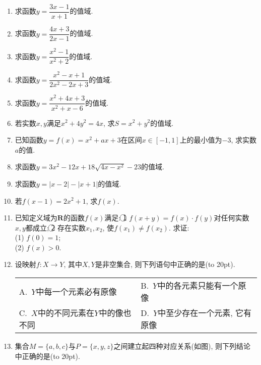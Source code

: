 \documentclass[10pt,a4paper]{article}
\newcommand{\bracket}[1]{(\hbox to #1pt{})}
\newcommand{\twoch}[4]{\par\begin{tabular}{p{.46\textwidth}p{.46\textwidth}}
A.~#1& B.~#2\\
C.~#3& D.~#4
\end{tabular}}
\begin{document}
\begin{enumerate}[1.]

\item 求函数$y=\dfrac{3x-1}{x+1}$的值域.
\item 求函数$y=\dfrac{4x+3}{2x-1}$的值域.
\item 求函数$y=\dfrac{x^2-1}{x^2+2}$的值域.
\item 求函数$y=\dfrac{x^2-x+1}{2x^2-2x+3}$的值域.
\item 求函数$y=\dfrac{x^2+4x+3}{x^2+x-6}$的值域.
\item 若实数$x,y$满足$x^2+4y^2=4x$, 求$S=x^2+y^2$的值域.
\item 已知函数$y=f(x)=x^2+ax+3$在区间$x\in [-1,1]$上的最小值为$-3$, 求实数$a$的值.
\item 求函数$y=3x^2-12x+18\sqrt {4x-x^2}-23$的值域.
\item 求函数$y=|x-2|-|x+1|$的值域.
\item 若$f(x-1)=2x^2+1$, 求$f(x)$.
\item 已知定义域为$\mathbf{R}$的函数$f(x)$满足:
\textcircled{1} $f(x+y)=f(x)\cdot f(y)$对任何实数$x,y$都成立;
\textcircled{2} 存在实数$x_1,x_2$, 使$f(x_1)\ne f(x_2)$.
求证:\\
(1) $f(0)=1$;\\
(2) $f(x)>0$.
\item 设映射$f:X\to Y$, 其中$X,Y$是非空集合, 则下列语句中正确的是\bracket{20}.
\twoch{$Y$中每一个元素必有原像}{$Y$中的各元素只能有一个原像}{$X$中的不同元素在$Y$中的像也不同}{$Y$中至少存在一个元素, 它有原像}
\item 集合$M=\{a,b,c\}$与$P=\{x,y,z\}$之间建立起四种对应关系(如图), 则下列结论中正确的是\bracket{20}.
\begin{center}
\end{center}
\end{enumerate}
\end{document}
